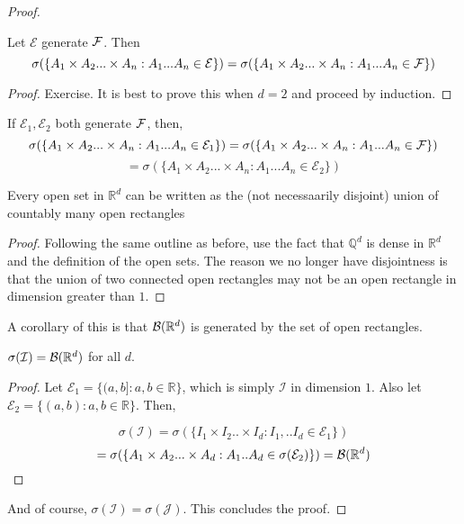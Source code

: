 \begin{proof}
   \begin{Proposition} 
      Let $\mathcal E$ generate $\mathcal F$. Then 
      \[ \sigma(\{A_1 \times A_2... \times A_n : A_1... A_n \in \mathcal E\}) = \sigma(\{A_1 \times A_2... \times A_n : A_1... A_n \in \mathcal F\})  \]
   \end{Proposition}

   \begin{proof}
      Exercise. It is best to prove this when $d=2$ and proceed by induction.
   \end{proof}

   \begin{corollary} 
      If $\mathcal E_1, \mathcal E_2$ both generate $\mathcal F$, then, 
      \[ \sigma(\{A_1 \times A_2... \times A_n : A_1... A_n \in \mathcal E_1\}) = \sigma(\{A_1 \times A_2... \times A_n : A_1... A_n \in \mathcal F\})  \]
      \[ = \sigma(\{A_1 \times A_2... \times A_n : A_1... A_n \in \mathcal E_2\}) \]
   \end{corollary}

   \begin{Proposition} 
      Every open set in $\mathbb R^d$ can be written as the (not necessaarily disjoint) union of 
      countably many open rectangles
   \end{Proposition}

   \begin{proof}
      Following the same outline as before, use the fact that $\mathbb Q^d$ is dense in 
      $\mathbb R^d$ and the definition of the open sets. The reason we no longer have disjointness 
      is that the union of two connected open rectangles may not be an open rectangle in dimension 
      greater than $1$.
   \end{proof}

   A corollary of this is that $\mathcal B(\mathbb R^d)$ is generated by the set of open rectangles.

   \begin{corollary} 
      $\sigma(\mathcal I) = \mathcal B(\mathbb R^d)$ for all $d$. 
   \end{corollary}

   \begin{proof}
      Let $\mathcal E_1 = \{ (a,b] : a,b \in \mathbb R\}$, which is simply 
      $\mathcal I$ in dimension $1$. Also let $\mathcal E_2 = \{ (a,b) : a,b \in \mathbb R\}$.
      Then, 

      \[ \sigma(\mathcal I) = \sigma(\{I_1 \times I_2.. \times I_d : I_1,..I_d \in \mathcal E_1\}) \]
      \[ = \sigma(\{A_1 \times A_2... \times A_d : A_1..A_d \in \sigma(\mathcal E_2)\})  = \mathcal B(\mathbb R^d) \]
   
   \end{proof}

   And of course, $\sigma(\mathcal I) = \sigma(\mathcal J)$. This concludes the proof.

\end{proof}

